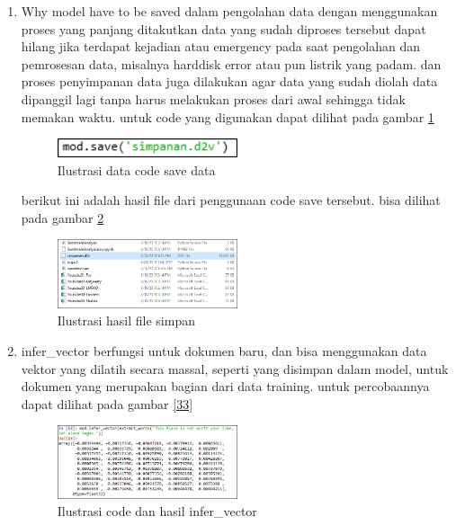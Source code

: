 \begin{enumerate}
\item Why model have to be saved
\subitem dalam pengolahan data dengan menggunakan proses yang panjang ditakutkan data yang sudah diproses tersebut dapat hilang jika terdapat kejadian atau emergency pada saat pengolahan dan pemrosesan data, misalnya harddisk error atau pun listrik yang padam. dan proses penyimpanan data juga dilakukan agar data yang sudah diolah data dipanggil lagi tanpa harus melakukan proses dari awal sehingga tidak memakan waktu. untuk code yang digunakan dapat dilihat pada gambar \ref{fig31}

\begin{figure}[!htbp]
	\centering
	\includegraphics[width=0.5\textwidth]{figures/fathi/chapter5/hari3/12}
	\caption{Ilustrasi data code save data}
	\label{fig31}
\end{figure}

berikut ini adalah hasil file dari penggunaan code save tersebut. bisa dilihat pada gambar \ref{fig32}
\begin{figure}[!htbp]
	\centering
	\includegraphics[width=0.5\textwidth]{figures/fathi/chapter5/hari3/13}
	\caption{Ilustrasi hasil file simpan}
	\label{fig32}
\end{figure}

\item infer\_vector
\subitem berfungsi untuk dokumen baru, dan  bisa menggunakan data vektor yang dilatih secara massal, seperti yang disimpan dalam model, untuk dokumen yang merupakan bagian dari data training. untuk percobaannya dapat dilihat pada gambar \ref{33}
\begin{figure}[!htbp]
	\centering
	\includegraphics[width=0.5\textwidth]{figures/fathi/chapter5/hari3/14}
	\caption{Ilustrasi code dan hasil infer\_vector}
	\label{fig33}
\end{figure}

\end{enumerate}